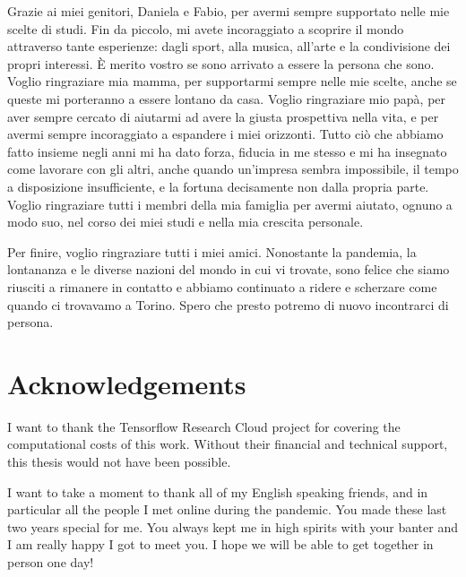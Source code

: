 Grazie ai miei genitori, Daniela e Fabio, per avermi sempre supportato nelle mie scelte di studi. Fin da piccolo, mi avete incoraggiato a scoprire il mondo attraverso tante esperienze: dagli sport, alla musica, all'arte e la condivisione dei propri interessi. È merito vostro se sono arrivato a essere la persona che sono. Voglio ringraziare mia mamma, per supportarmi sempre nelle mie scelte, anche se queste mi porteranno a essere lontano da casa. Voglio ringraziare mio papà, per aver sempre cercato di aiutarmi ad avere la giusta prospettiva nella vita, e per avermi sempre incoraggiato a espandere i miei orizzonti. Tutto ciò che abbiamo fatto insieme negli anni mi ha dato forza, fiducia in me stesso e mi ha insegnato come lavorare con gli altri, anche quando un'impresa sembra impossibile, il tempo a disposizione insufficiente, e la fortuna decisamente non dalla propria parte.
Voglio ringraziare tutti i membri della mia famiglia per avermi aiutato, ognuno a modo suo, nel corso dei miei studi e nella mia crescita personale.

Per finire, voglio ringraziare tutti i miei amici. Nonostante la pandemia, la lontananza e le diverse nazioni del mondo in cui vi trovate, sono felice che siamo riusciti a rimanere in contatto e abbiamo continuato a ridere e scherzare come quando ci trovavamo a Torino. Spero che presto potremo di nuovo incontrarci di persona. 

\section*{Acknowledgements}
I want to thank the Tensorflow Research Cloud project for covering the computational costs of this work. Without their financial and technical support, this thesis would not have been possible.

I want to take a moment to thank all of my English speaking friends, and in particular all the people I met online during the pandemic. You made these last two years special for me. You always kept me in high spirits with your banter and I am really happy I got to meet you. I hope we will be able to get together in person one day!
